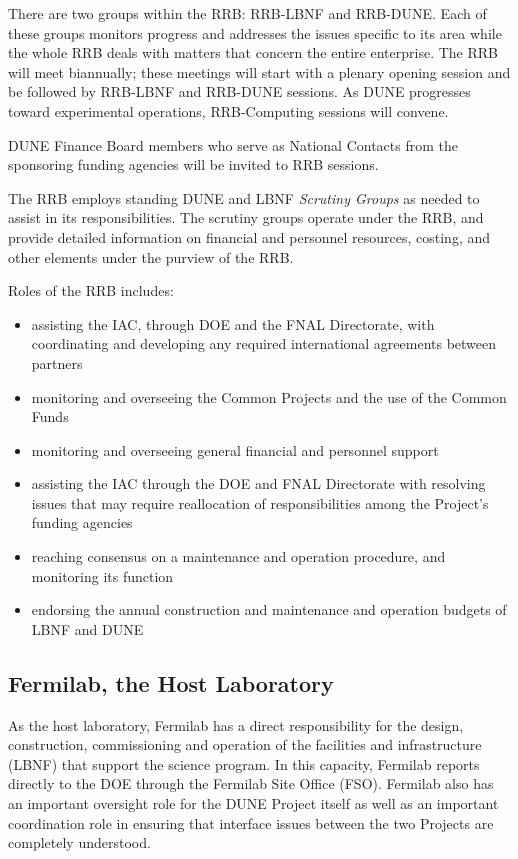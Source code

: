 There are two groups %
within the RRB: RRB-LBNF and RRB-DUNE. Each of
these groups monitors progress and addresses %
 the issues specific to its area %
 while the whole RRB deals with matters
that concern the entire enterprise. %
The RRB will meet
biannually; these meetings %
will start with a plenary
opening session %
and be followed by %
RRB-LBNF and RRB-DUNE sessions. As DUNE progresses toward
experimental operations, RRB-Computing sessions will convene.

DUNE Finance Board members who serve as National Contacts from the %
sponsoring funding agencies will be invited to RRB sessions.

The RRB %
employs standing DUNE and LBNF \textit{Scrutiny Groups} as needed
to assist in its responsibilities. The scrutiny groups operate
under the RRB, and provide detailed information on financial and
personnel resources, costing, and other elements under the purview of the RRB.

Roles of the RRB includes:

\begin{itemize}
\item assisting the IAC, through DOE and the FNAL Directorate,
with coordinating and developing any required international
agreements between partners
\item monitoring and overseeing the Common Projects and the
use of the Common Funds
\item monitoring and overseeing general financial and personnel support
\item assisting the IAC through the DOE and FNAL Directorate
with resolving issues that may require reallocation of responsibilities
among the Project's funding agencies
\item reaching consensus on a maintenance and operation procedure,
and monitoring its function
\item  endorsing the annual construction and maintenance and operation
budgets of LBNF and DUNE
\end{itemize}

\subsection{Fermilab, the Host Laboratory}

As the host laboratory, Fermilab has a direct responsibility for the design,
construction, commissioning and operation of the facilities and
infrastructure (LBNF) that support the science program. 
In this capacity, Fermilab reports
directly to the DOE through the Fermilab Site Office (FSO).
Fermilab also has an important oversight role for the DUNE Project
itself as well as an important coordination role in ensuring that
interface issues between the two Projects are completely understood.

